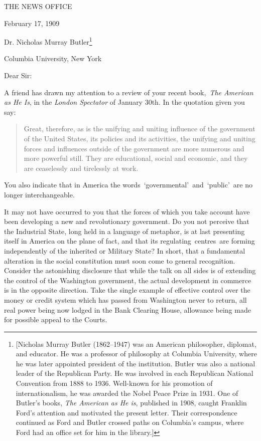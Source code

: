 \documentclass[twoside,symmetric,nobib,justified]{tufte-book}
\begin{document}
\vspace{0.5in}

\begin{center}

{\Large THE NEWS OFFICE}

\end{center}

\hfill February 17, 1909~

\vspace{.2in}

\noindent Dr. Nicholas Murray Butler\footnote{{[}Nicholas Murray
  Butler (1862--1947) was an American philosopher, diplomat,
  and educator. He was a professor
  of philosophy at Columbia University, where he was later appointed
  president of the institution. Butler was also a national leader of the
  Republican Party. He was involved in each Republican National
  Convention from 1888 to 1936. Well-known for his promotion
  of internationalism, he was awarded the Nobel Peace Prize in 1931. One
  of Butler's books, \emph{The American as He is}, published in
  1908, caught Franklin Ford's attention
  and motivated the present letter. Their correspondence continued as
  Ford and Butler crossed paths on Columbia's campus, where Ford had an
  office set for him in the library.{]}} 

Columbia University, New York~

\vspace{0.1in}

\noindent Dear Sir:~

A friend has drawn my attention to a review of your recent
book,~\emph{The American as He Is}, in the \emph{London Spectator} of
January 30th. In the quotation given you say:~

\begin{quote}
Great, therefore, as is the unifying and uniting influence of the
government of the United States, its policies and its activities, the
unifying and uniting forces and influences outside of the government are
more numerous and more powerful still. They are educational, social and
economic, and they are ceaselessly and tirelessly at work.~
\end{quote}

\noindent You also indicate that in America the
words~`governmental'~and~`public'~are no longer interchangeable.~

It may not have occurred to you that the forces of which you take
account have been developing a new and revolutionary government. Do you
not perceive that the Industrial State, long held in a language of
metaphor, is at last presenting itself in America on the plane of fact,
and that its regulating~centres~are forming independently of the
inherited or Military State? In short, that a fundamental alteration in
the social constitution must soon come to general recognition. Consider
the astonishing disclosure that while the talk on all sides is of
extending the control of the Washington government, the actual
development in commerce is in the opposite direction. Take the single
example of effective control over the money or credit system which has
passed from Washington never to return, all real power being now lodged
in the Bank Clearing House, allowance being made for possible appeal to
the Courts.~
\end{document}
